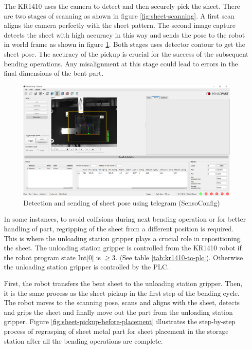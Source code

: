 The KR1410 uses the camera to detect and then securely pick the sheet. There are two stages of scanning as shown in figure \ref{fig:sheet-scanning}. A first scan aligns the camera perfectly with the sheet pattern. The second image capture detects the sheet with high accuracy in this way and sends the pose to the robot in world frame as shown in figure \ref{fig:sensoconfig-pattern}. Both stages uses detector contour to get the sheet pose.
The accuracy of the pickup is crucial for the success of the subsequent bending operations. Any misalignment at this stage could lead to errors in the final dimensions of the bent part.


\begin{figure}[h]
    \centering
    \includegraphics[width=\textwidth]{figures/sheet-pickup/sensoconfig.PNG}
    \caption{Detection and sending of sheet pose using telegram (SensoConfig)}
    \label{fig:sensoconfig-pattern}
\end{figure}

In some instances, to avoid collisions during next bending operation or for better handling of part, regripping of the sheet from a different position is required. This is where the unloading station gripper plays a crucial role in repositioning the sheet. The unloading station gripper is controlled from the KR1410 robot if the robot program state Int[0] is $\ge$3. (See table \ref{tab:kr1410-to-plc}). Otherwise the unloading station gripper is controlled by the PLC. 

First, the robot transfers the bent sheet to the unloading station gripper. Then, it is the same process as the sheet pickup in the first step of the bending cycle. The robot moves to the scanning pose, scans and aligns with the sheet, detects and grips the sheet and finally move out the part from the unloading station gripper.
Figure \ref{fig:sheet-pickup-before-placement} illustrates the step-by-step process of regrasping of sheet metal part for sheet placement in the storage station after all the bending operations are complete.


